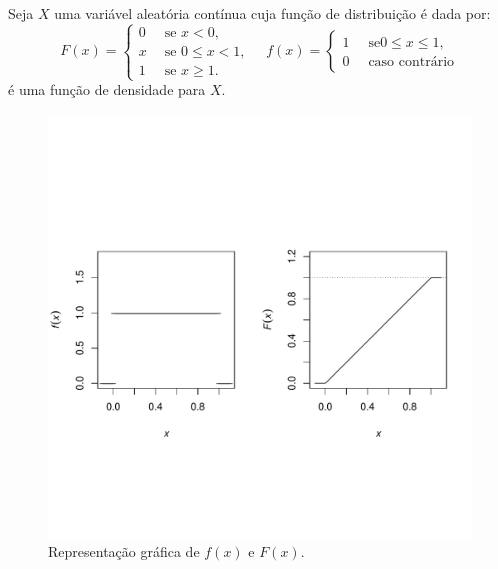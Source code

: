 \begin{frame}
\begin{exem} 
	Seja $X$ uma variável aleatória contínua cuja função de distribuição é dada por: 
	$$
	F(x)=\begin{cases}
	0\;\;&\text{se }x<0, \\
	x&\text{se }0\leq x<1, \\
	1&\text{se }x\geq 1.%
	\end{cases}
	\quad 
	f(x)=\begin{cases}
	1\;\;&\text{se}0\leq x\leq 1, \\
	0&\text{caso contrário}%
	\end{cases}
	$$
	é  uma função de densidade para $X$.
\end{exem} 

\begin{figure}[!htbp]
	\vspace{-2.5cm}\begin{center}
		\includegraphics[scale=0.5]{fig15.pdf}\vspace{-2.3cm}
		\caption{\label{fig15} Representação gráfica de $f(x)$ e $F(x)$.}
	\end{center}
\end{figure}
\end{frame}
